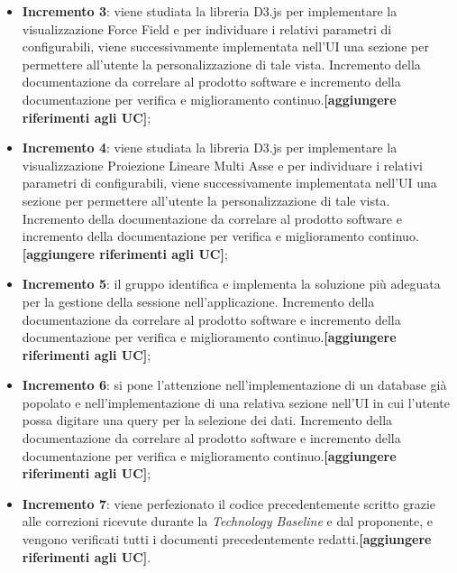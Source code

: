 \begin{itemize}
\begin{itemize}
	\item \textbf{Incremento 3}: viene studiata la libreria D3.js per implementare la visualizzazione Force Field e per individuare i relativi parametri di configurabili, viene successivamente implementata nell'UI una sezione per permettere all'utente la personalizzazione di tale vista. Incremento della documentazione da correlare al prodotto software e incremento della documentazione per verifica e miglioramento continuo.\textbf{[aggiungere riferimenti agli UC]};
	
	\item \textbf{Incremento 4}: viene studiata la libreria D3.js per implementare la visualizzazione Proiezione Lineare Multi Asse e per individuare i relativi parametri di configurabili, viene successivamente implementata nell'UI una sezione per permettere all'utente la personalizzazione di tale vista. Incremento della documentazione da correlare al prodotto software e incremento della documentazione per verifica e miglioramento continuo.\textbf{[aggiungere riferimenti agli UC]};
	
	\item \textbf{Incremento 5}: il gruppo identifica e implementa la soluzione più adeguata per la gestione della sessione nell'applicazione. Incremento della documentazione da correlare al prodotto software e incremento della documentazione per verifica e miglioramento continuo.\textbf{[aggiungere riferimenti agli UC]};
	
	\item \textbf{Incremento 6}: si pone l'attenzione nell'implementazione di un database già popolato e nell'implementazione di una relativa sezione nell'UI in cui l'utente possa digitare una query per la selezione dei dati. Incremento della documentazione da correlare al prodotto software e incremento della documentazione per verifica e miglioramento continuo.\textbf{[aggiungere riferimenti agli UC]};
	
	\item \textbf{Incremento 7}: viene perfezionato il codice precedentemente scritto grazie alle correzioni ricevute durante la \textit{Technology Baseline} e dal proponente, e vengono verificati tutti i documenti precedentemente redatti.\textbf{[aggiungere riferimenti agli UC]}.
	\end{itemize}
\end{itemize}

